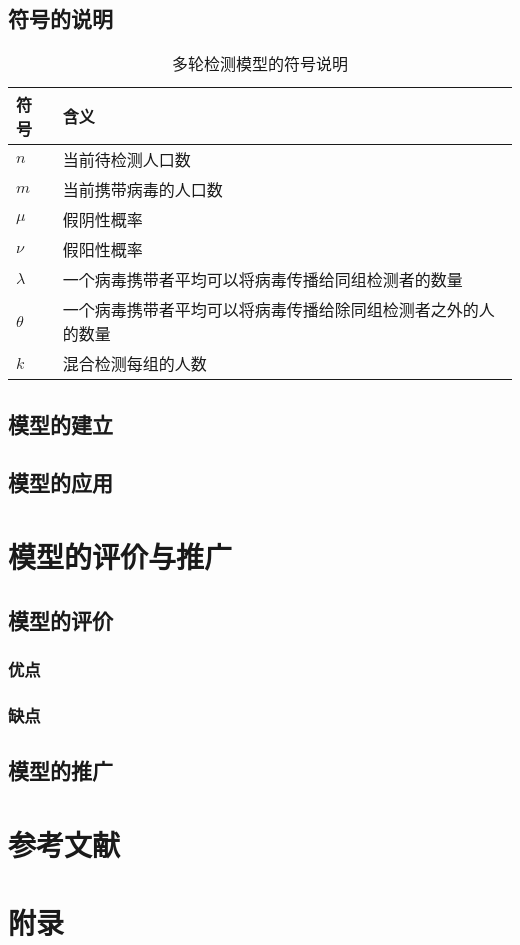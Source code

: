 \documentclass[12pt]{article}
\begin{document}
\subsection{符号的说明}

\begin{table}[h]
\centering
\begin{tabular}{|l|l|} 
\hline
符号 & 含义 \\
\hline
$n$ & 当前待检测人口数 \\
$m$ & 当前携带病毒的人口数 \\
$\mu$ & 假阴性概率 \\
$\nu$ & 假阳性概率 \\
$\lambda$ & 一个病毒携带者平均可以将病毒传播给同组检测者的数量 \\
$\theta$ & 
一个病毒携带者平均可以将病毒传播给除同组检测者之外的人的数量 \\
$k$ & 混合检测每组的人数 \\
\hline
\end{tabular}
\caption{多轮检测模型的符号说明}
\end{table}


\subsection{模型的建立}

\subsection{模型的应用}

{\centering\section{模型的评价与推广}}

\subsection{模型的评价}

\subsubsection{优点}

\subsubsection{缺点}

\subsection{模型的推广}

{\centering\section*{参考文献}}

\newpage
{\centering\section*{附录}}
\end{document}
